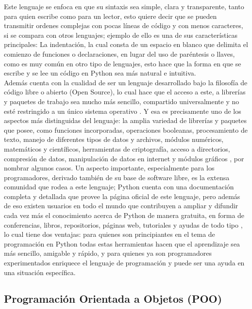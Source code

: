 \documentclass[11pt,lettersize]{article} %
\begin{document}
Este lenguaje se enfoca en que su sintaxis sea simple, clara y transparente, tanto para quien escribe como para un lector, esto quiere decir que se pueden transmitir ordenes complejas con pocas líneas de código y con menos caracteres, si se compara con otros lenguajes; ejemplo de ello es una de sus características principales: La indentación, la cual consta de un espacio en blanco que delimita el comienzo de funciones o declaraciones, en lugar del uso de paréntesis o llaves, como es muy común en otro tipo de lenguajes, esto hace que la forma en que se escribe y se lee un código en Python sea más natural e intuitiva. \\

Además cuenta con la cualidad de ser un lenguaje desarrollado bajo la filosofía de código libre o abierto (Open Source), lo cual hace que el acceso a este, a librerías y paquetes de trabajo sea mucho más sencillo, compartido universalmente y no esté restringido a un único sistema operativo \cite{Python}. Y esa es precisamente uno de los aspectos más distinguidas del lenguaje: la amplia variedad de librerías y paquetes que posee, como funciones incorporadas, operaciones booleanas, procesamiento de texto, manejo de diferentes tipos de datos y archivos, módulos numéricos, matemáticos y científicos, herramientas de criptografía, acceso a directorios, compresión de datos, manipulación de datos en internet y módulos gráficos \cite{Pythonlibrary}, por nombrar algunos casos. Un aspecto importante, especialmente para los programadores, derivado también de su base de software libre, es la extensa comunidad que rodea a este lenguaje; Python cuenta con una documentación completa y detallada que provee la página oficial de este lenguaje, pero además de eso existen usuarios en todo el mundo que contribuyen a ampliar y difundir cada vez más el conocimiento acerca de Python de manera gratuita, en forma de conferencias, libros, repositorios, páginas web, tutoriales y ayudas de todo tipo \cite{Python}, lo cual tiene dos ventajas: para quienes son principiantes en el tema de programación en Python todas estas herramientas hacen que el aprendizaje sea más sencillo, amigable y rápido, y para quienes ya son programadores experimentados enriquece el lenguaje de programación y puede ser una ayuda en una situación específica.

\subsection{Programación Orientada a Objetos (POO)}
\label{S-POO}
\end{document}
